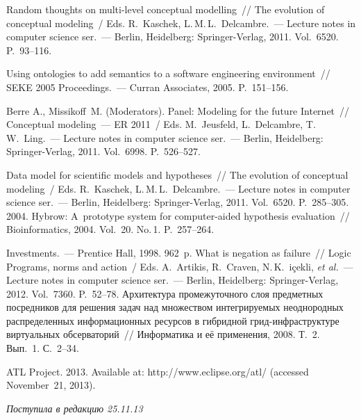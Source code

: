 \begin{multicols}{2}
{{\begin{thebibliography}{99}
 Random thoughts on multi-level conceptual modelling~// The
evolution of conceptual modeling~/ Eds. R.~Kaschek, L.\,M.\,L.~Delcambre.~---
 Lecture notes in computer science ser.~---
Berlin, Heidelberg: Springer-Verlag, 2011. Vol.~6520. P.~93--116.

 Using ontologies to add semantics to a software
engineering environment~// SEKE 2005 Proceedings.~--- Curran Associates, 2005.
P.~151--156.

Berre A.,  Missikoff~M. (Moderators).  Panel: Modeling for the future Internet~//
Conceptual modeling~--- ER 2011~/ 
Eds. M.~Jeusfeld, L.~Delcambre, T.\,W.~Ling.~--- Lecture notes in
computer science ser.~--- Berlin, Heidelberg: Springer-Verlag, 2011. Vol.~6998. P.~526--527.

 Data model for scientific models and hypotheses~//
The evolution of conceptual modeling~/
Eds. R.~Kaschek, L.\,M.\,L.~Delcambre.~--- Lecture notes in computer science ser.~---
Berlin, Heidelberg: Springer-Verlag, 2011. Vol.~6520. P.~285--305.
 2004. Hybrow: A~prototype
system for computer-aided hypothesis evaluation~// Bioinformatics, 2004. Vol.~20. No.\,1.
P.~257--264.

 Investments.~--- Prentice Hall, 1998.
962~p.
 What is negation as failure~// Logic Programs, norms and action~/
Eds. A.~Artikis, R.~Craven, N.\,K.~i{\!\!\ptb\c{c}}ekli, \textit{et al.}~---
Lecture notes in computer science ser.~--- Berlin, Heidelberg:
Springer-Verlag, 2012. Vol.~7360. P.~52--78.
Архитектура  промежуточного слоя предметных посредников для решения \mbox{задач} над
множеством интегрируемых неоднородных распределенных информационных
ресурсов в гиб\-рид\-ной  грид-инф\-ра\-струк\-ту\-ре виртуальных обсерваторий~//
Информатика и её применения, 2008. Т.~2. Вып.~1. С.~2--34.

ATL Project. 2013. Available at: {\sf http://www.eclipse.org/\linebreak atl/} (accessed November~21,
2013).

 \label{end\stat}


\end{thebibliography}
} }

\end{multicols}

\hfill{\small\textit{Поступила в редакцию 25.11.13}}
\renewcommand{\figurename}{\protect\bf Рис.}